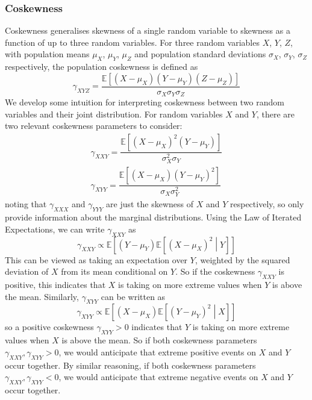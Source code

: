 \documentclass[11pt]{report} %
\begin{document}
\subsubsection{Coskewness}

Coskewness generalises skewness of a single random variable to skewness as a function of up to three random variables. For three random variables $X$, $Y$, $Z$, with population means $\mu_{X}$, $\mu_{Y}$, $\mu_{Z}$ and population standard deviations $\sigma_{X}$, $\sigma_{Y}$, $\sigma_{Z}$ respectively, the population coskewness is defined as
\begin{equation}
\gamma_{XYZ} = \dfrac{\mathbb{E}\left[\left(X - \mu_{X}\right)\left(Y - \mu_{Y}\right)\left(Z - \mu_{Z}\right)\right]}{\sigma_{X}\sigma_{Y}\sigma_{Z}}
\end{equation}
We develop some intuition for interpreting coskewness between two random variables and their joint distribution. For random variables $X$ and $Y$, there are two relevant coskewness parameters to consider:
\begin{gather}
\gamma_{XXY} = \dfrac{\mathbb{E}\left[\left(X - \mu_{X}\right)^{2}\left(Y - \mu_{Y}\right)\right]}{\sigma_{X}^{2}\sigma_{Y}} \\
\gamma_{XYY} = \dfrac{\mathbb{E}\left[\left(X - \mu_{X}\right)\left(Y - \mu_{Y}\right)^{2}\right]}{\sigma_{X}\sigma_{Y}^{2}}
\end{gather}
noting that $\gamma_{XXX}$ and $\gamma_{YYY}$ are just the skewness of $X$ and $Y$ respectively, so only provide information about the marginal distributions. Using the Law of Iterated Expectations, we can write $\gamma_{XXY}$ as
\begin{equation}
\gamma_{XXY} \propto \mathbb{E}\left[\left(Y - \mu_{Y}\right)\mathbb{E}\left[\left(X - \mu_{X}\right)^{2}\middle|Y\right]\right]
\end{equation}
This can be viewed as taking an expectation over $Y$, weighted by the squared deviation of $X$ from its mean conditional on $Y$. So if the coskewness $\gamma_{XXY}$ is positive, this indicates that $X$ is taking on more extreme values when $Y$ is above the mean. Similarly, $\gamma_{XYY}$ can be written as
\begin{equation}
\gamma_{XYY} \propto \mathbb{E}\left[\left(X - \mu_{X}\right)\mathbb{E}\left[\left(Y - \mu_{Y}\right)^{2}\middle|X\right]\right]
\end{equation}
so a positive coskewness $\gamma_{XYY} > 0$ indicates that $Y$ is taking on more extreme values when $X$ is above the mean. So if both coskewness parameters $\gamma_{XXY}, \gamma_{XYY} > 0$, we would anticipate that extreme positive events on $X$ and $Y$ occur together. By similar reasoning, if both coskewness parameters $\gamma_{XXY}, \gamma_{XYY} < 0$, we would anticipate that extreme negative events on $X$ and $Y$ occur together.
\end{document}
